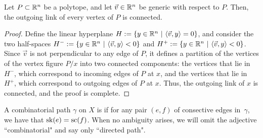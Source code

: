 
\begin{proposition}
\label{prop:polytopes}
    Let $P \subset \mathbb R^n$ be a polytope, and let $\vec v \in \mathbb R^n$ be generic with respect to $P$. 
    Then, the outgoing link of every vertex of $P$ is connected.
\end{proposition}

\begin{proof}
    Define the linear hyperplane $H:=\{y \in \mathbb R^n \ | \ \langle \vec v, y \rangle = 0\}$, and consider the two half-spaces $H^{-}:=\{y \in \mathbb R^n \ | \ \langle \vec v, y \rangle < 0\}$ and $H^{+}:=\{y \in \mathbb R^n \ | \ \langle \vec v, y \rangle < 0\}$.
    Since $\vec v$ is not perpendicular to any edge of $P$, it defines a partition of the vertices of the vertex figure $P/x$ into two connected components: the vertices that lie in $H^{-}$, which correspond to incoming edges of $P$ at $x$, and the vertices that lie in $H^{+}$, which correspond to outgoing edges of $P$ at $x$.
    Thus, the outgoing link of $x$ is connected, and the proof is complete.
\end{proof}


A combinatorial path $\gamma$ on $X$ is  if for any pair $(e, f)$ of consective edges in~$\gamma$, we have that $\mathrm{sk}(e)=\mathrm{sc}(f)$.  
When no ambiguity arises, we will omit the adjective ``combinatorial" and say only ``directed path".

